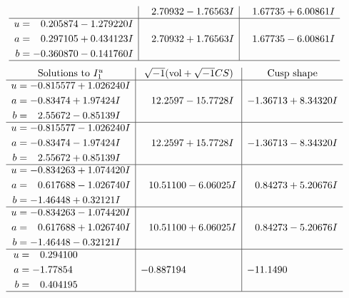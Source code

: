 \documentclass[1p]{elsarticle_modified}
\theoremstyle{definition}
\newcommand{\I}{\sqrt{-1}}
\begin{document}
$$\begin{array}{c|c|c}
 & \phantom{-}2.70932 - 1.76563 I & \phantom{-}1.67735 + 6.00861 I \\ \hline\begin{aligned}
u &= \phantom{-}0.205874 - 1.279220 I \\
a &= \phantom{-}0.297105 + 0.434123 I \\
b &= -0.360870 - 0.141760 I\end{aligned}
 & \phantom{-}2.70932 + 1.76563 I & \phantom{-}1.67735 - 6.00861 I\\
 \hline 
 \end{array}$$\newpage$$\begin{array}{c|c|c}  
\text{Solutions to }I^u_{1}& \I (\text{vol} + \sqrt{-1}CS) & \text{Cusp shape}\\
 \hline 
\begin{aligned}
u &= -0.815577 + 1.026240 I \\
a &= -0.83474 + 1.97424 I \\
b &= \phantom{-}2.55672 - 0.85139 I\end{aligned}
 & \phantom{-}12.2597 - 15.7728 I & -1.36713 + 8.34320 I \\ \hline\begin{aligned}
u &= -0.815577 - 1.026240 I \\
a &= -0.83474 - 1.97424 I \\
b &= \phantom{-}2.55672 + 0.85139 I\end{aligned}
 & \phantom{-}12.2597 + 15.7728 I & -1.36713 - 8.34320 I \\ \hline\begin{aligned}
u &= -0.834263 + 1.074420 I \\
a &= \phantom{-}0.617688 - 1.026740 I \\
b &= -1.46448 + 0.32121 I\end{aligned}
 & \phantom{-}10.51100 - 6.06025 I & \phantom{-}0.84273 + 5.20676 I \\ \hline\begin{aligned}
u &= -0.834263 - 1.074420 I \\
a &= \phantom{-}0.617688 + 1.026740 I \\
b &= -1.46448 - 0.32121 I\end{aligned}
 & \phantom{-}10.51100 + 6.06025 I & \phantom{-}0.84273 - 5.20676 I \\ \hline\begin{aligned}
u &= \phantom{-}0.294100\phantom{ +0.000000I} \\
a &= -1.77854\phantom{ +0.000000I} \\
b &= \phantom{-}0.404195\phantom{ +0.000000I}\end{aligned}
 & -0.887194\phantom{ +0.000000I} & -11.1490\phantom{ +0.000000I}\\
 \hline 
 \end{array}$$\newpage\newpage\renewcommand{\arraystretch}{1}
\end{document}
